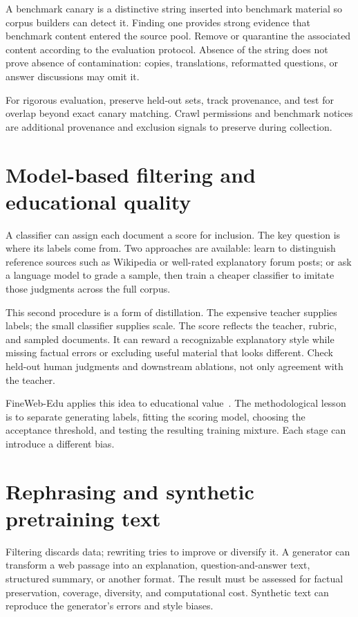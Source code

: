 A benchmark canary is a distinctive string inserted into benchmark material so corpus builders can detect it. Finding one provides strong evidence that benchmark content entered the source pool. Remove or quarantine the associated content according to the evaluation protocol. Absence of the string does not prove absence of contamination: copies, translations, reformatted questions, or answer discussions may omit it.

For rigorous evaluation, preserve held-out sets, track provenance, and test for overlap beyond exact canary matching. Crawl permissions and benchmark notices are additional provenance and exclusion signals to preserve during collection.

\section{Model-based filtering and educational quality}
A classifier can assign each document a score for inclusion. The key question is where its labels come from. Two approaches are available: learn to distinguish reference sources such as Wikipedia or well-rated explanatory forum posts; or ask a language model to grade a sample, then train a cheaper classifier to imitate those judgments across the full corpus.

This second procedure is a form of distillation. The expensive teacher supplies labels; the small classifier supplies scale. The score reflects the teacher, rubric, and sampled documents. It can reward a recognizable explanatory style while missing factual errors or excluding useful material that looks different. Check held-out human judgments and downstream ablations, not only agreement with the teacher.

FineWeb-Edu applies this idea to educational value~\cite{fineweb}. The methodological lesson is to separate generating labels, fitting the scoring model, choosing the acceptance threshold, and testing the resulting training mixture. Each stage can introduce a different bias.

\section{Rephrasing and synthetic pretraining text}
Filtering discards data; rewriting tries to improve or diversify it. A generator can transform a web passage into an explanation, question-and-answer text, structured summary, or another format. The result must be assessed for factual preservation, coverage, diversity, and computational cost. Synthetic text can reproduce the generator's errors and style biases.

